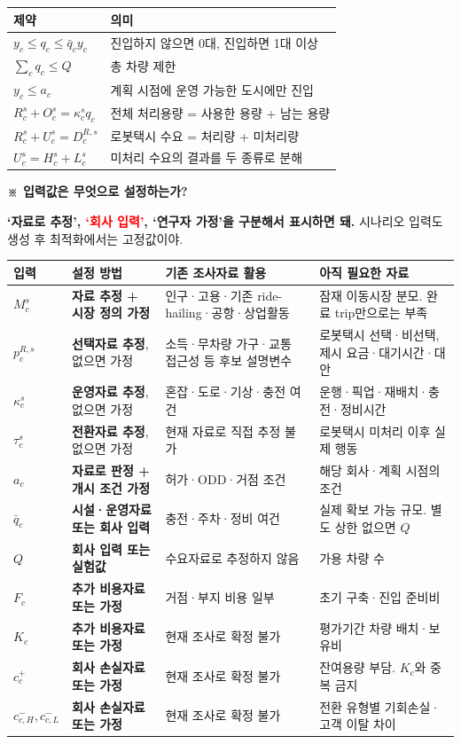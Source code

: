 \documentclass[11pt,a4paper]{article}
\newcommand{\blocktitle}[1]{\par\bigskip\noindent\textbf{\large #1}\par\smallskip}
\begin{document}
\begin{longtable}{@{}P{0.32\textwidth}P{0.62\textwidth}@{}}
\toprule
제약 & 의미 \\
\midrule
\endhead
$y_c\le q_c\le\bar q_cy_c$ & 진입하지 않으면 0대, 진입하면 1대 이상 \\
$\sum_cq_c\le Q$ & 총 차량 제한 \\
$y_c\le a_c$ & 계획 시점에 운영 가능한 도시에만 진입 \\
$R_c^s+O_c^s=\kappa_c^s q_c$ & 전체 처리용량 = 사용한 용량 + 남는 용량 \\
$R_c^s+U_c^s=D_c^{R,s}$ & 로봇택시 수요 = 처리량 + 미처리량 \\
$U_c^s=H_c^s+L_c^s$ & 미처리 수요의 결과를 두 종류로 분해 \\
\bottomrule
\end{longtable}

\blocktitle{※ 입력값은 무엇으로 설정하는가?}

\textbf{`자료로 추정', \textcolor{red}{`회사 입력'}, `연구자 가정'을 구분해서 표시하면 돼.} 시나리오 입력도 생성 후 최적화에서는 고정값이야.

\begin{longtable}{@{}P{0.14\textwidth}P{0.24\textwidth}P{0.24\textwidth}P{0.28\textwidth}@{}}
\toprule
입력 & 설정 방법 & 기존 조사자료 활용 & 아직 필요한 자료 \\
\midrule
\endhead
$M_c^s$ & \textbf{자료 추정 + 시장 정의 가정} & 인구·고용·기존 ride-hailing·공항·상업활동 & 잠재 이동시장 분모. 완료 trip만으로는 부족 \\
$p_c^{R,s}$ & \textbf{선택자료 추정}, 없으면 가정 & 소득·무차량 가구·교통 접근성 등 후보 설명변수 & 로봇택시 선택·비선택, 제시 요금·대기시간·대안 \\
$\kappa_c^s$ & \textbf{운영자료 추정}, 없으면 가정 & 혼잡·도로·기상·충전 여건 & 운행·픽업·재배치·충전·정비시간 \\
$\tau_c^s$ & \textbf{전환자료 추정}, 없으면 가정 & 현재 자료로 직접 추정 불가 & 로봇택시 미처리 이후 실제 행동 \\
$a_c$ & \textbf{자료로 판정 + 개시 조건 가정} & 허가·ODD·거점 조건 & 해당 회사·계획 시점의 조건 \\
$\bar q_c$ & \textbf{시설·운영자료 또는 회사 입력} & 충전·주차·정비 여건 & 실제 확보 가능 규모. 별도 상한 없으면 $Q$ \\
$Q$ & \textbf{회사 입력 또는 실험값} & 수요자료로 추정하지 않음 & 가용 차량 수 \\
$F_c$ & \textbf{추가 비용자료 또는 가정} & 거점·부지 비용 일부 & 초기 구축·진입 준비비 \\
$K_c$ & \textbf{추가 비용자료 또는 가정} & 현재 조사로 확정 불가 & 평가기간 차량 배치·보유비 \\
$c_c^+$ & \textbf{회사 손실자료 또는 가정} & 현재 조사로 확정 불가 & 잔여용량 부담. $K_c$와 중복 금지 \\
$c_{c,H}^-,c_{c,L}^-$ & \textbf{회사 손실자료 또는 가정} & 현재 조사로 확정 불가 & 전환 유형별 기회손실·고객 이탈 차이 \\
\bottomrule
\end{longtable}
\end{document}
